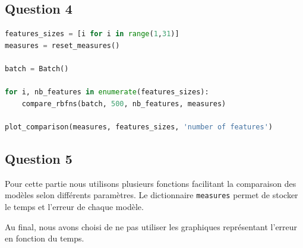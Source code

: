 \documentclass[french,12pt]{article}
\begin{document}
\subsection*{Question 4}

\begin{lstlisting}[language=Python]
features_sizes = [i for i in range(1,31)]
measures = reset_measures()

batch = Batch()

for i, nb_features in enumerate(features_sizes):
	compare_rbfns(batch, 500, nb_features, measures)

plot_comparison(measures, features_sizes, 'number of features')
\end{lstlisting}

\subsection*{Question 5}

Pour cette partie nous utilisons plusieurs fonctions facilitant la comparaison des modèles selon différents paramètres. Le dictionnaire \lstinline{measures} permet de stocker le temps et l'erreur de chaque modèle.

Au final, nous avons choisi de ne pas utiliser les graphiques représentant l'erreur en fonction du temps.
\end{document}
